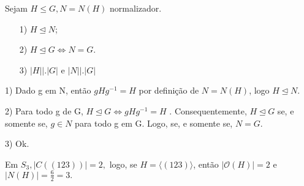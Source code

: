 \documentclass[algebra_notes.tex]{subfiles}
\begin{document}
\begin{prop*}
	Sejam \(H\leq G, N = N(H)\) normalizador.
	\begin{itemize}
		\item[1)] \(H \trianglelefteq N\);
		\item[2)] \(H \trianglelefteq{G} \Longleftrightarrow N = G.\)
		\item[3)] \(|H|\bigl|\bigr.|G|\) e \(|N|\bigl|\bigr.|G|\)
	\end{itemize}
\end{prop*}
\begin{proof*}
	1) Dado g em N, então \(gHg^{-1}=H\) por definição de \(N = N(H)\), logo
	\(H \trianglelefteq{N}.\)

	2) Para todo g de G, \(H \trianglelefteq{G} \Longleftrightarrow gHg^{-1} = H\) .
	Consequentemente, \(H \trianglelefteq{G}\) se, e somente se, \(g\in N\) para todo g em G.
	Logo, se, e somente se, \(N = G.\)

	3) Ok. \qedsymbol
\end{proof*}
\begin{example*}
	Em \(S_{3}, |C((123))| = 2,\) logo, se \(H = \langle(123)\rangle\), então \(|\mathcal{O}(H)| = 2\) e
	\(|N(H)| = \frac{6}{2} = 3.\)
\end{example*}
\end{document}
